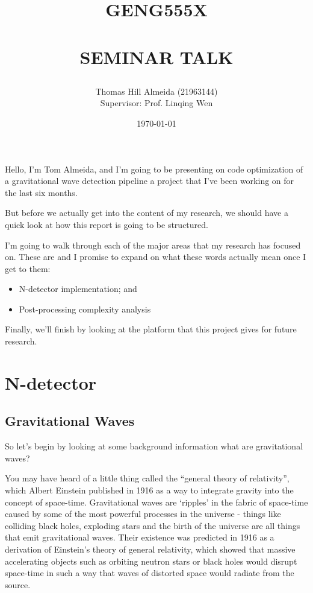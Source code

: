 \documentclass{article}
\title{\normalsize \textsc{GENG555X}
        \\ [1.5cm]
        \HRule{0.5pt} \\
        \LARGE \textbf{\uppercase{Seminar Talk}}
        \HRule{2pt} \\ [0.5cm]
        \normalsize \date{\today} \vspace*{3\baselineskip}}
\author{Thomas Hill Almeida (21963144)\\
Supervisor: Prof. Linqing Wen}
\date{}
\begin{document}
\maketitle{}
\tableofcontents{}
\newpage{}

Hello, I'm Tom Almeida, and I'm going to be presenting on code optimization of a gravitational wave detection pipeline \textemdash{} a project that I've been working on for the last six months.

But before we actually get into the content of my research, we should have a quick look at how this report is going to be structured.

I'm going to walk through each of the major areas that my research has focused on.
These are \textemdash{} and I promise to expand on what these words actually mean once I get to them:

\begin{itemize}
    \item N-detector implementation; and
    \item Post-processing complexity analysis
\end{itemize}

Finally, we'll finish by looking at the platform that this project gives for future research.

\section{N-detector}

\subsection{Gravitational Waves}

So let's begin by looking at some background information\textellipsis{} what are gravitational waves?

You may have heard of a little thing called the ``general theory of relativity'', which Albert Einstein published in 1916 as a way to integrate gravity into the concept of space-time.
Gravitational waves are `ripples' in the fabric of space-time caused by some of the most powerful processes in the universe - things like colliding black holes, exploding stars and the birth of the universe are all things that emit gravitational waves.
Their existence was predicted in 1916 as a derivation of Einstein's theory of general relativity, which showed that massive accelerating objects such as orbiting neutron stars or black holes would disrupt space-time in such a way that waves of distorted space would radiate from the source.
\end{document}
